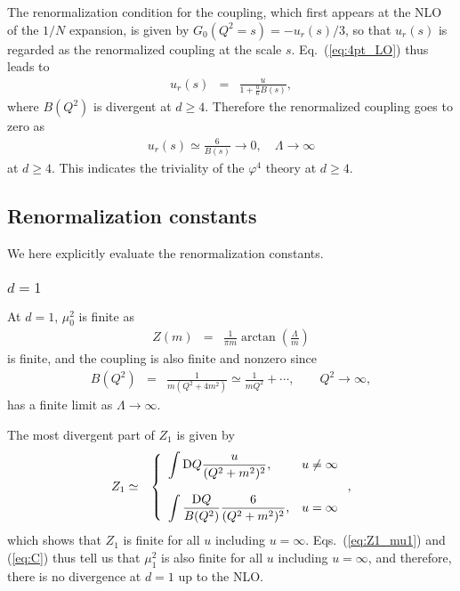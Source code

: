 \documentclass[preprint]{ptephy_v1}%
\newcommand{\rmD}{{\rm D}}
\begin{document}
The renormalization condition for the coupling, which first appears at the NLO of the $1/N$ expansion, is given by  $G_0(Q^2=s) = -u_r(s)/3$, so that
$u_r(s)$ is regarded as the renormalized  coupling at the scale $s$. 
Eq.~(\ref{eq:4pt_LO}) thus leads to
\begin{eqnarray}
u_r(s) &=& \frac{u}{1+\frac{u}{6} B(s)},
\end{eqnarray}
where 
$B(Q^2)$ is divergent at $d \ge 4$.
Therefore the renormalized  coupling goes to zero as
\begin{eqnarray}
u_r(s) \simeq \frac{6}{B(s)} \rightarrow 0, \quad \Lambda \rightarrow \infty 
\end{eqnarray}
at $d\ge 4$. This  indicates the triviality of the $\varphi^4$ theory at $d\ge 4$. 

\subsection{Renormalization constants}
We here explicitly evaluate the renormalization constants.
\subsubsection{$d=1$}
At $d=1$, $\mu_0^2$ is finite as
\begin{eqnarray}
Z(m) &=&  \frac{1}{\pi m} \arctan \left(\frac{\Lambda}{m} \right) 
\end{eqnarray} 
is finite, and
the  coupling is also  finite and nonzero  since
\begin{eqnarray}
B(Q^2) &=&  \frac{1}{ m (Q^2+4m^2)} \simeq \frac{1}{m Q^2}+\cdots,\qquad  Q^2\to\infty,
\end{eqnarray} 
 has a finite limit as $\Lambda\to\infty$.

The most divergent part of $Z_1$ is given by
\begin{eqnarray}
Z_1 &\simeq&\left\{
\begin{array}{ll}
\displaystyle  \int \rmD Q \frac{u}{(Q^2+m^2)^2}, &u\not=\infty \\
\\
\displaystyle  \int \frac{\rmD Q}{B(Q^2)}\frac{6}{(Q^2+m^2)^2} , &u=\infty \\
\end{array}
\right. ,
\end{eqnarray}
which shows that $Z_1$ is finite for all $u$ including $u=\infty$.
 Eqs.~(\ref{eq:Z1_mu1}) and (\ref{eq:C}) thus tell us
that $\mu_1^2$ is also finite for all $u$ including $u=\infty$, and therefore,  there is no divergence at $d=1$ up to the NLO.
\end{document}
